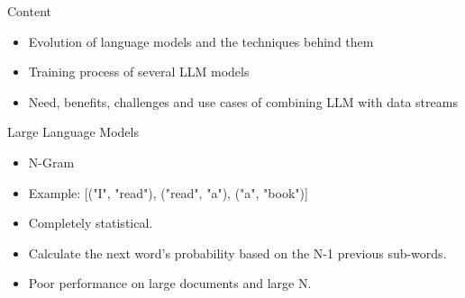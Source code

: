 \documentclass[t]{beamer}
\begin{document}
\begin{frame}{Content}
  \vspace{1cm}
  \begin{itemize}
    \item Evolution of language models and the techniques behind them
    \newline
    \item Training process of several LLM models
    \newline
    \item Need, benefits, challenges and use cases of combining LLM with data streams
  \end{itemize}
\end{frame}
\begin{frame}{Large Language Models}
  \vspace{3cm}
  \centering
\vspace{1cm}
\begin{itemize}
  \item N-Gram \cite{Cavnar94}
  \item Example: [("I", "read"), ("read", "a"), ("a", "book")]
  \item Completely statistical.
  \item Calculate the next word's probability based on the N-1 previous sub-words.
  \item Poor performance on large documents and large N.
\end{itemize}
\end{frame}
\end{document}
